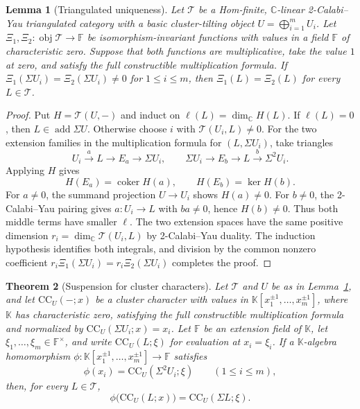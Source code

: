 \documentclass[11pt]{amsart}
\numberwithin{equation}{section}
\newtheorem{theorem}{Theorem}[section]
\newtheorem{lemma}[theorem]{Lemma}
\theoremstyle{definition}
\theoremstyle{remark}
\newcommand{\op}[1]{\operatorname{#1}}
\newcommand{\CC}{\mathrm{CC}}
\newcommand{\kk}{\mathbb C}
\newcommand{\add}{\op{add}}
\newcommand{\coker}{\op{coker}}
\begin{document}
\begin{lemma}[Triangulated uniqueness]\label{lem:triangulated-uniqueness}
Let $\mathcal T$ be a Hom-finite, $\kk$-linear 2-Calabi--Yau
triangulated category with a basic cluster-tilting object $U=\bigoplus_{i=1}^mU_i$. Let
$\Xi_1,\Xi_2:\op{obj}\mathcal T\to\mathbb F$ be isomorphism-invariant
functions with values in a field $\mathbb F$ of characteristic zero.
Suppose that both functions are multiplicative, take the value $1$ at
zero, and satisfy the full constructible multiplication formula. If
$\Xi_1(\Sigma U_i)=\Xi_2(\Sigma U_i)\ne0$ for $1\leq i\leq m$,
then $\Xi_1(L)=\Xi_2(L)$ for every $L\in\mathcal T$.
\end{lemma}

\begin{proof}
Put $H=\mathcal T(U,-)$ and induct on
$\ell(L)=\dim_\kk H(L)$. If $\ell(L)=0$, then
$L\in\add\Sigma U$. Otherwise choose $i$ with
$\mathcal T(U_i,L)\ne0$. For the two extension families in the
multiplication formula for $(L,\Sigma U_i)$, take triangles
\[
U_i\xrightarrow{a}L\longrightarrow E_a\longrightarrow\Sigma U_i,
\qquad
\Sigma U_i\longrightarrow E_b\longrightarrow L\xrightarrow{b}\Sigma^2U_i.
\]
Applying $H$ gives
\[
H(E_a)=\coker H(a),\qquad H(E_b)=\ker H(b).
\]
For $a\ne0$, the summand projection $U\to U_i$ shows $H(a)\ne0$.
For $b\ne0$, the 2-Calabi--Yau pairing gives $a:U_i\to L$ with
$ba\ne0$, hence $H(b)\ne0$. Thus both middle terms have smaller
$\ell$. The two extension spaces have the same positive dimension
$r_i=\dim_\kk\mathcal T(U_i,L)$ by 2-Calabi--Yau duality. The induction
hypothesis identifies both integrals, and division by the common nonzero
coefficient $r_i\Xi_1(\Sigma U_i)=r_i\Xi_2(\Sigma U_i)$ completes the
proof.
\end{proof}

\begin{theorem}[Suspension for cluster characters]
\label{thm:triangulated-transport}
Let $\mathcal T$ and $U$ be as in Lemma~\ref{lem:triangulated-uniqueness},
and let $\CC_U(-;x)$ be a cluster character with values in
$\mathbb K[x_1^{\pm1},\ldots,x_m^{\pm1}]$, where $\mathbb K$ has
characteristic zero, satisfying the full constructible multiplication
formula and normalized by $\CC_U(\Sigma U_i;x)=x_i$. Let $\mathbb F$
be an extension field of $\mathbb K$, let
$\xi_1,\ldots,\xi_m\in\mathbb F^\times$, and write $\CC_U(L;\xi)$ for
evaluation at $x_i=\xi_i$. If a $\mathbb K$-algebra homomorphism
$\phi:\mathbb K[x_1^{\pm1},\ldots,x_m^{\pm1}]\to\mathbb F$ satisfies
\[ \phi(x_i)=\CC_U(\Sigma^2U_i;\xi) \qquad(1\leq i\leq m), \]
then, for every $L\in\mathcal T$,
\[ \phi\bigl(\CC_U(L;x)\bigr)=\CC_U(\Sigma L;\xi). \]
\end{theorem}
\end{document}
